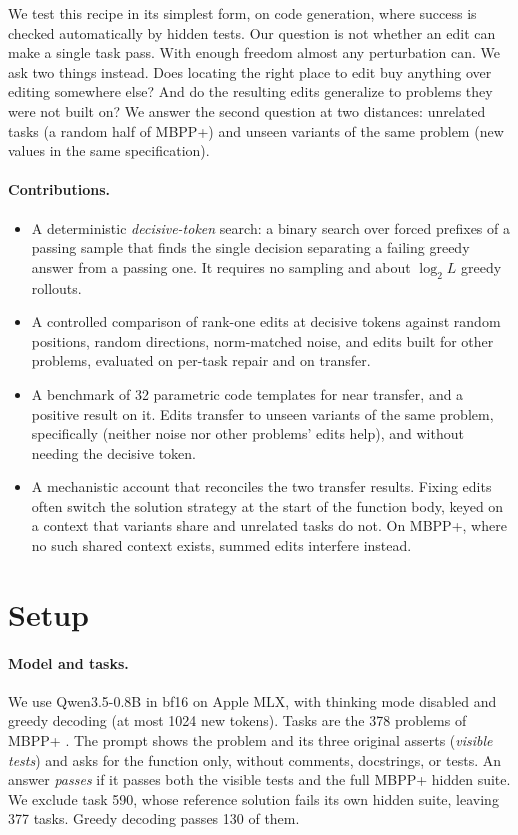 \documentclass[11pt]{article}
\begin{document}
We test this recipe in its simplest form, on code generation, where success is checked automatically by hidden tests. Our question is not whether an edit can make a single task pass. With enough freedom almost any perturbation can. We ask two things instead. Does locating the right place to edit buy anything over editing somewhere else? And do the resulting edits generalize to problems they were not built on? We answer the second question at two distances: unrelated tasks (a random half of MBPP+) and unseen variants of the same problem (new values in the same specification).

\paragraph{Contributions.}
\begin{itemize}
\item A deterministic \emph{decisive-token} search: a binary search over forced prefixes of a passing sample that finds the single decision separating a failing greedy answer from a passing one. It requires no sampling and about $\log_2 L$ greedy rollouts.
\item A controlled comparison of rank-one edits at decisive tokens against random positions, random directions, norm-matched noise, and edits built for other problems, evaluated on per-task repair and on transfer.
\item A benchmark of 32 parametric code templates for near transfer, and a positive result on it. Edits transfer to unseen variants of the same problem, specifically (neither noise nor other problems' edits help), and without needing the decisive token.
\item A mechanistic account that reconciles the two transfer results. Fixing edits often switch the solution strategy at the start of the function body, keyed on a context that variants share and unrelated tasks do not. On MBPP+, where no such shared context exists, summed edits interfere instead.
\end{itemize}

\section{Setup}
\paragraph{Model and tasks.}
We use Qwen3.5-0.8B \citep{qwen35} in bf16 on Apple MLX, with thinking mode disabled and greedy decoding (at most 1024 new tokens). Tasks are the 378 problems of MBPP+ \citep{austin2021mbpp,liu2023evalplus}. The prompt shows the problem and its three original asserts (\emph{visible tests}) and asks for the function only, without comments, docstrings, or tests. An answer \emph{passes} if it passes both the visible tests and the full MBPP+ hidden suite. We exclude task 590, whose reference solution fails its own hidden suite, leaving 377 tasks. Greedy decoding passes 130 of them.
\end{document}
